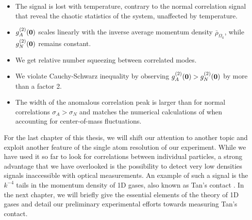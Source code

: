 \begin{itemize}
    \begin{itemize}
        \item The signal is lost with temperature, contrary to the normal correlation signal that reveal the chaotic statistics of the system, unaffected by temperature.
        \item $g^{(2)}_A(\bm{0})$ scales linearly with the inverse average momentum density $\bar{\rho}_{\Omega_k}$, while $g^{(2)}_N(\bm{0})$ remains constant.
        \item We get relative number squeezing between correlated modes.
        \item We violate Cauchy-Schwarz inequality by observing $g^{(2)}_A(\bm{0}) > g^{(2)}_N(\bm{0})$ by more than a factor 2.
        \item The width of the anomalous correlation peak is larger than for normal correlations $\sigma_A > \sigma_N$ and matches the numerical calculations of \cite{butera2020} when accounting for center-of-mass fluctuations.
    \end{itemize}
\end{itemize}

For the last chapter of this thesis, we will shift our attention to another topic and exploit another feature of the single atom resolution of our experiment. While we have used it so far to look for correlations between individual particles, a strong advantage that we have overlooked is the possibility to detect very low densities signals inaccessible with optical measurements. An example of such a signal is the $k^{-4}$ tails in the momentum density of 1D gases, also known as Tan's contact \cite{tan2008large}. In the next chapter, we will briefly give the essential elements of the theory of 1D gases and detail our preliminary experimental efforts towards measuring Tan's contact.


